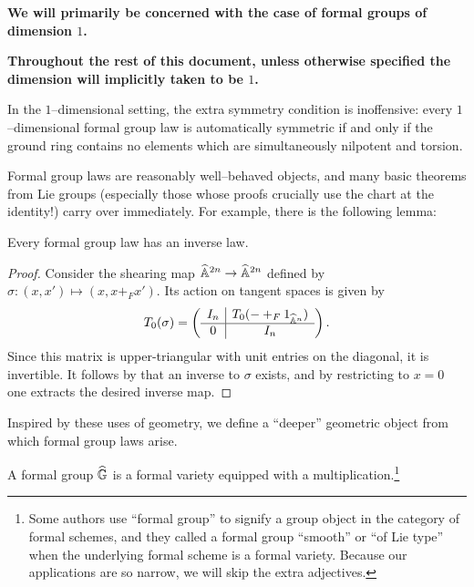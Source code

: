 \begin{center}
\textbf{We will primarily be concerned with the case of formal groups of dimension $1$.}

\textbf{Throughout the rest of this document, unless otherwise specified the dimension will implicitly taken to be $1$.}
\end{center}

\begin{remark}
In the $1$--dimensional setting, the extra symmetry condition is inoffensive: every $1$--dimensional formal group law is automatically symmetric if and only if the ground ring contains no elements which are simultaneously nilpotent and torsion.
\end{remark}

Formal group laws are reasonably well--behaved objects, and many basic theorems from Lie groups (especially those whose proofs crucially use the chart at the identity!) carry over immediately.  For example, there is the following lemma:

\begin{lemma}
Every formal group law has an inverse law.
\end{lemma}
\begin{proof}
Consider the shearing map $\widehat{\mathbb{A}}^{2n} \to \widehat{\mathbb{A}}^{2n}$ defined by $\sigma: (x, x') \mapsto (x, x +_F x')$.  Its action on tangent spaces is given by \[T_0 (\sigma) = \left( \begin{array}{c|c} I_n & T_0( - +_F 1_{\widehat{\mathbb{A}}^n} ) \\ \hline 0 & I_n \end{array} \right).\]  Since this matrix is upper-triangular with unit entries on the diagonal, it is invertible.  It follows by  that an inverse to $\sigma$ exists, and by restricting to $x = 0$ one extracts the desired inverse map.
\end{proof}

Inspired by these uses of geometry, we define a ``deeper'' geometric object from which formal group laws arise.
\begin{definition}
A formal group $\widehat{\mathbb G}$ is a formal variety equipped with a multiplication.\footnote{Some authors use ``formal group'' to signify a group object in the category of formal schemes, and they called a formal group ``smooth'' or ``of Lie type'' when the underlying formal scheme is a formal variety.  Because our applications are so narrow, we will skip the extra adjectives.}
\end{definition}


